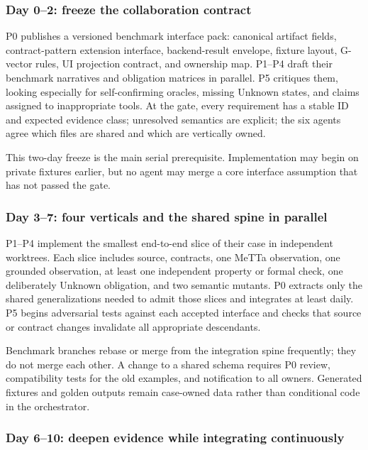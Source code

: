 \documentclass[11pt]{article}
\begin{document}
\subsubsection*{Day 0--2: freeze the collaboration contract}

P0 publishes a versioned benchmark interface pack: canonical artifact fields,
contract-pattern extension interface, backend-result envelope, fixture layout,
G-vector rules, UI projection contract, and ownership map.  P1--P4 draft their
benchmark narratives and obligation matrices in parallel.  P5 critiques them,
looking especially for self-confirming oracles, missing Unknown states, and
claims assigned to inappropriate tools.  At the gate, every requirement has a
stable ID and expected evidence class; unresolved semantics are explicit; the
six agents agree which files are shared and which are vertically owned.

This two-day freeze is the main serial prerequisite.  Implementation may begin
on private fixtures earlier, but no agent may merge a core interface assumption
that has not passed the gate.

\subsubsection*{Day 3--7: four verticals and the shared spine in parallel}

P1--P4 implement the smallest end-to-end slice of their case in independent
worktrees.  Each slice includes source, contracts, one MeTTa observation, one
grounded observation, at least one independent property or formal check, one
deliberately Unknown obligation, and two semantic mutants.  P0 extracts only
the shared generalizations needed to admit those slices and integrates at
least daily.  P5 begins adversarial tests against each accepted interface and
checks that source or contract changes invalidate all appropriate descendants.

Benchmark branches rebase or merge from the integration spine frequently;
they do not merge each other.  A change to a shared schema requires P0 review,
compatibility tests for the old examples, and notification to all owners.
Generated fixtures and golden outputs remain case-owned data rather than
conditional code in the orchestrator.

\subsubsection*{Day 6--10: deepen evidence while integrating continuously}
\end{document}
